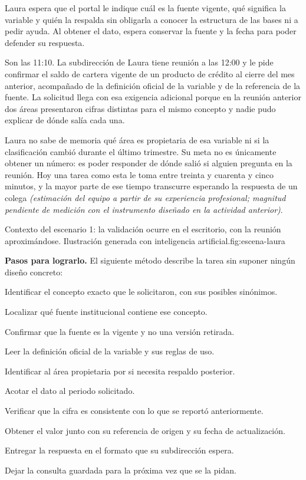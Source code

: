 
Laura espera que el portal le indique cuál es la fuente vigente, qué significa la variable
y quién la respalda sin obligarla a conocer la estructura de las bases ni a pedir ayuda. Al
obtener el dato, espera conservar la fuente y la fecha para poder defender su respuesta.


Son las 11:10. La subdirección de Laura tiene reunión a las 12:00 y le pide confirmar el saldo
de cartera vigente de un producto de crédito al cierre del mes anterior, acompañado de la
definición oficial de la variable y de la referencia de la fuente. La solicitud llega con esa
exigencia adicional porque en la reunión anterior dos áreas presentaron cifras distintas para
el mismo concepto y nadie pudo explicar de dónde salía cada una.

Laura no sabe de memoria qué área es propietaria de esa variable ni si la clasificación
cambió durante el último trimestre. Su meta no es únicamente obtener un número: es poder
responder de dónde salió si alguien pregunta en la reunión. Hoy una tarea como esta le toma
entre treinta y cuarenta y cinco minutos, y la mayor parte de ese tiempo transcurre esperando
la respuesta de un colega \emph{(estimación del equipo a partir de su experiencia
profesional; magnitud pendiente de medición con el instrumento diseñado en la actividad
anterior)}.

  {Contexto del escenario 1: la validación ocurre en el escritorio, con la reunión
   aproximándose. Ilustración generada con inteligencia artificial.}{fig:escena-laura}

\textbf{\textcolor{uxnavy}{Pasos para lograrlo.}} El siguiente método describe la tarea sin
suponer ningún diseño concreto:

\begin{uxpreg}
\item Identificar el concepto exacto que le solicitaron, con sus posibles sinónimos.
\item Localizar qué fuente institucional contiene ese concepto.
\item Confirmar que la fuente es la vigente y no una versión retirada.
\item Leer la definición oficial de la variable y sus reglas de uso.
\item Identificar al área propietaria por si necesita respaldo posterior.
\item Acotar el dato al periodo solicitado.
\item Verificar que la cifra es consistente con lo que se reportó anteriormente.
\item Obtener el valor junto con su referencia de origen y su fecha de actualización.
\item Entregar la respuesta en el formato que su subdirección espera.
\item Dejar la consulta guardada para la próxima vez que se la pidan.
\end{uxpreg}


